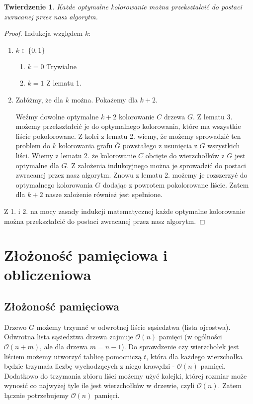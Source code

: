 \documentclass{article}
\newtheorem{thm}{Twierdzenie}
\begin{document}
\begin{thm}
Każde optymalne kolorowanie można przekształcić do postaci zwracanej przez nasz algorytm.
\end{thm}
\begin{proof}
Indukcja względem $k$:
\begin{enumerate}
    \item $k \in \{0, 1\}$
    \begin{enumerate}
        \item $k = 0$ Trywialne
        \item $k = 1$ Z lematu 1.
    \end{enumerate}
    \item Załóżmy, że dla $k$ można. Pokażemy dla $k+2$.
    
    Weźmy dowolne optymalne $k+2$ kolorowanie $C$ drzewa $G$. Z lematu 3. możemy przekształcić je do optymalnego kolorowania, które ma wszystkie liście pokolorowane. Z kolei z lematu 2. wiemy, że możemy sprowadzić ten problem do $k$ kolorowania grafu $\overline{G}$ powstałego z usunięcia z $G$ wszystkich liści. Wiemy z lematu 2. że kolorowanie ${C}$ obcięte do wierzchołków z $\overline{G}$ jest optymalne dla $\overline{G}$. Z założenia indukcyjnego można je sprowadzić do postaci zwracanej przez nasz algorytm. Znowu z lematu 2. możemy je rozszerzyć do optymalnego kolorowania $G$ dodając z powrotem pokolorowane liście. Zatem dla $k+2$ nasze założenie również jest spełnione.
\end{enumerate}
Z 1. i 2. na mocy zasady indukcji matematycznej każde optymalne kolorowanie można przekształcić do postaci zwracanej przez nasz algorytm.
\end{proof}

\section{Złożoność pamięciowa i obliczeniowa}
\subsection{Złożoność pamięciowa}
Drzewo $G$ możemy trzymać w odwrotnej liście sąsiedztwa (lista ojcostwa). Odwrotna lista sąsiedztwa drzewa zajmuje $\mathcal{O}(n)$ pamięci (w ogólności $\mathcal{O}(n+m)$, ale dla drzewa $m = n -1$). Do sprawdzenie czy wierzchołek jest liściem możemy utworzyć tablicę pomocniczą $t$, która dla każdego wierzchołka będzie trzymała liczbę wychodzących z niego krawędzi - $\mathcal{O}(n)$ pamięci. Dodatkowo do trzymania zbioru liści możemy użyć kolejki, której rozmiar może wynosić co najwyżej tyle ile jest wierzchołków w drzewie, czyli $\mathcal{O}(n)$. Zatem łącznie potrzebujemy $\mathcal{O}(n)$ pamięci.
\end{document}

